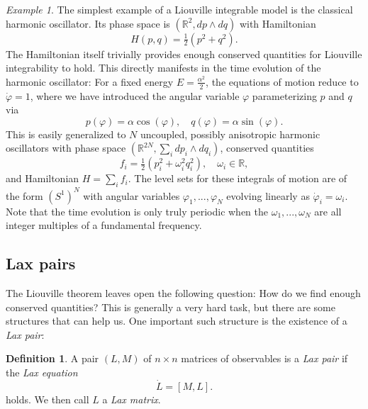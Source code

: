 \documentclass[11pt]{report}
\theoremstyle{definition}
\newtheorem{definition}[theorem]{Definition}
\theoremstyle{remark}
\theoremstyle{remark}
\newtheorem*{example}{Example}
\newcommand{\R}{\mathbb{R}}
\begin{document}
\begin{example}
The simplest example of a Liouville integrable model is the classical harmonic oscillator. Its phase space is $(\R^2,dp \wedge dq)$ with Hamiltonian
\begin{equation*}
H(p,q) = \tfrac{1}{2} (p^2 + q^2).
\end{equation*}
The Hamiltonian itself trivially provides enough conserved quantities for Liouville integrability to hold. This directly manifests in the time evolution of the harmonic oscillator: For a fixed energy $E = \frac{\alpha^2}{2}$, the equations of motion reduce to $\dot \varphi = 1$, where we have introduced the angular variable $\varphi$ parameterizing $p$ and $q$ via
\begin{equation*}
p(\varphi) = \alpha \cos(\varphi), \quad q(\varphi) = \alpha \sin(\varphi).
\end{equation*}
This is easily generalized to $N$ uncoupled, possibly anisotropic harmonic oscillators with phase space $(\R^{2N},\sum_i dp_i \wedge dq_i)$, conserved quantities
\begin{equation*}
f_i = \tfrac{1}{2}(p_i^2 + \omega_i^2 q_i^2), \quad \omega_i \in \R,
\end{equation*}
and Hamiltonian $H = \sum_i f_i$. The level sets for these integrals of motion are of the form $(S^1)^N$ with angular variables $\varphi_1,...,\varphi_N$ evolving linearly as $\dot \varphi_i = \omega_i$. Note that the time evolution is only truly periodic when the $\omega_1,...,\omega_N$ are all integer multiples of a fundamental frequency.
\end{example}

\subsection{Lax pairs}

The Liouville theorem leaves open the following question: How do we find enough conserved quantities? This is generally a very hard task, but there are some structures that can help us. One important such structure is the existence of a \emph{Lax pair}:

\begin{definition} 
A pair $(L,M)$ of $n \times n$ matrices of observables is a \emph{Lax pair} if the \emph{Lax equation}
\begin{equation*}
\dot L = [M,L].
\end{equation*}
holds. We then call $L$ a \emph{Lax matrix}.
\end{definition}
\end{document}
